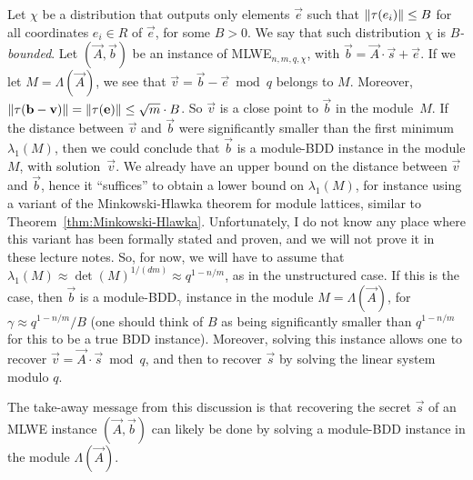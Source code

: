Let $\chi$ be a distribution that outputs only elements $\vec e$ such that $\|\tau(e_i)\| \leq B$ for all coordinates $e_i \in R$ of $\vec e$, for some $B > 0$. We say that such distribution $\chi$ is \emph{$B$-bounded}.
Let $(\vec A, \vec b)$ be an instance of MLWE$_{n,m,q,\chi}$, with $\vec b = \vec A \cdot \vec s + \vec e$.  If we let $M = \Lambda(\vec A)$, we see that $\vec v = \vec b - \vec e \bmod q$ belongs to $M$. Moreover, $\|\tau(\mathbf b - \mathbf v)\| =  \| \tau(\mathbf e)\| \leq \sqrt{m} \cdot B$. So $\vec v$ is a close point to $\vec b$ in the module~$M$. If the distance between $\vec v$ and $\vec b$ were significantly smaller than the first minimum $\lambda_1(M)$, then we could conclude that $\vec b$ is a module-BDD instance in the module $M$, with solution~$\vec v$. We already have an upper bound on the distance between $\vec v$ and $\vec b$, hence it ``suffices'' to obtain a lower bound on $\lambda_1(M)$, for instance using a variant of the Minkowski-Hlawka theorem for module lattices, similar to Theorem~\ref{thm:Minkowski-Hlawka}. Unfortunately, I do not know any place where this variant has been formally stated and proven, and we will not prove it in these lecture notes. So, for now, we will have to assume that $\lambda_1(M) \approx \det(M)^{1/(dm)} \approx q^{1-n/m}$, as in the unstructured case. If this is the case, then $\vec b$ is a module-BDD$_\gamma$ instance in the module $M = \Lambda(\vec A)$, for $\gamma \approx q^{1-n/m}/B$ (one should think of $B$ as being significantly smaller than $q^{1-n/m}$ for this to be a true BDD instance).
Moreover, solving this instance allows one to recover $\vec v = \vec A \cdot \vec s \bmod q$, and then to recover $\vec s$ by solving the linear system modulo $q$.

The take-away message from this discussion is that recovering the secret $\vec s$ of an MLWE instance $(\vec A, \vec b)$ can likely be done by solving a module-BDD instance in the module $\Lambda(\vec A)$.




